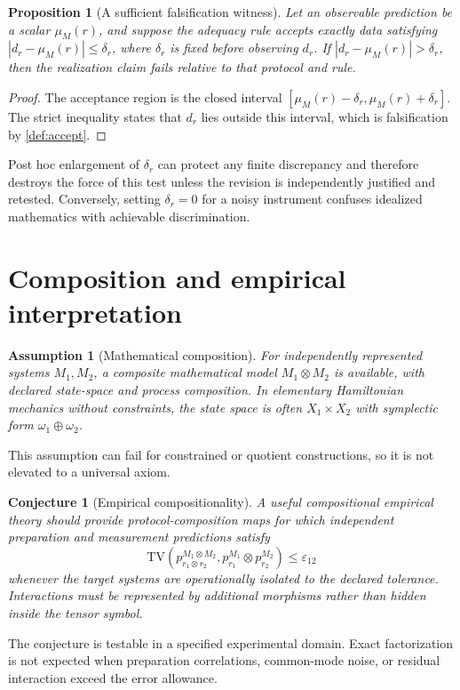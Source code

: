 \documentclass[11pt]{article}
\newtheorem{assumption}[definition]{Assumption}
\newtheorem{conjecture}[definition]{Conjecture}
\newtheorem{proposition}[definition]{Proposition}
\theoremstyle{remark}
\newcommand{\TV}{\mathrm{TV}}
\begin{document}
\begin{proposition}[A sufficient falsification witness]\label{prop:witness}
Let an observable prediction be a scalar $\mu_M(r)$, and suppose the adequacy rule accepts exactly data satisfying $|d_r-\mu_M(r)|\leq\delta_r$, where $\delta_r$ is fixed before observing $d_r$.  If $|d_r-\mu_M(r)|>\delta_r$, then the realization claim fails relative to that protocol and rule.
\end{proposition}
\begin{proof}
The acceptance region is the closed interval $[\mu_M(r)-\delta_r,\mu_M(r)+\delta_r]$.  The strict inequality states that $d_r$ lies outside this interval, which is falsification by \cref{def:accept}.
\end{proof}

Post hoc enlargement of $\delta_r$ can protect any finite discrepancy and therefore destroys the force of this test unless the revision is independently justified and retested.  Conversely, setting $\delta_r=0$ for a noisy instrument confuses idealized mathematics with achievable discrimination.

\section{Composition and empirical interpretation}

\begin{assumption}[Mathematical composition]\label{ass:composition}
For independently represented systems $M_1,M_2$, a composite mathematical model $M_1\otimes M_2$ is available, with declared state-space and process composition.  In elementary Hamiltonian mechanics without constraints, the state space is often $X_1\times X_2$ with symplectic form $\omega_1\oplus\omega_2$.
\end{assumption}
This assumption can fail for constrained or quotient constructions, so it is not elevated to a universal axiom.

\begin{conjecture}[Empirical compositionality]\label{conj:empcomp}
A useful compositional empirical theory should provide protocol-composition maps for which independent preparation and measurement predictions satisfy
\[
 \TV\!\left(p^{M_1\otimes M_2}_{r_1\otimes r_2},
 p^{M_1}_{r_1}\otimes p^{M_2}_{r_2}\right)\leq\varepsilon_{12}
\]
whenever the target systems are operationally isolated to the declared tolerance.  Interactions must be represented by additional morphisms rather than hidden inside the tensor symbol.
\end{conjecture}
The conjecture is testable in a specified experimental domain.  Exact factorization is not expected when preparation correlations, common-mode noise, or residual interaction exceed the error allowance.
\end{document}
